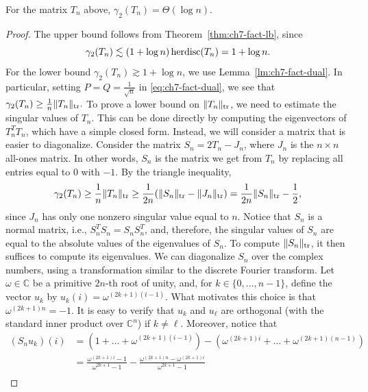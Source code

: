 \begin{lemma}\label{lm:ch7-gamma2-Tn}
  For the matrix $T_n$ above, $\gamma_2(T_n) = \Theta(\log n)$. 
\end{lemma}
\begin{proof}
  The upper bound follows from Theorem~\ref{thm:ch7-fact-lb}, since
  \[
    \gamma_2(T_n) \lesssim (1 + \log n) \operatorname{herdisc}(T_n) = 1 + \log n.
  \]
  For the lower bound $\gamma_2(T_n) \gtrsim 1+\log n$, we use
  Lemma~\ref{lm:ch7-fact-dual}. In particular, setting $P = Q =
  \frac{1}{\sqrt{n}}$ in \eqref{eq:ch7-fact-dual}, we see that
  \(
    \gamma_2(T_n) \ge \frac1n \|T_n\|_{\operatorname{tr}}.
  \)
  To prove a lower bound on $\|T_n\|_{\operatorname{tr}}$, we need to estimate the
  singular values of $T_n$. This can be done directly by computing the
  eigenvectors of $T_n^T T_n$, which have a simple closed
  form. Instead, we will consider a matrix that is easier to
  diagonalize. Consider the matrix $S_n = 2T_n - J_n$, where $J_n$ is
  the $n\times n$ all-ones matrix. In other words, $S_n$ is the matrix
  we get from $T_n$ by replacing all entries equal to $0$ with
  $-1$. By the triangle inequality,
  \begin{equation}\label{eq:ch7-Tn-lb}
    \gamma_2(T_n) \ge \frac1n \|T_n\|_{\operatorname{tr}}
    \ge \frac{1}{2n} (\|S_n\|_{\operatorname{tr}} - \|J_n\|_{\operatorname{tr}})
    = \frac{1}{2n} \|S_n\|_{\operatorname{tr}} - \frac12,
  \end{equation}
  since $J_n$ has only one nonzero singular value equal to $n$. Notice
  that $S_n$ is a normal matrix, i.e., $S_n^T S_n = S_nS_n^T$, and,
  therefore, the singular values of $S_n$ are equal to the absolute
  values of the eigenvalues of $S_n$. To compute $\|S_n\|_{\operatorname{tr}}$, it
  then suffices to compute its eigenvalues. We can diagonalize $S_n$
  over the complex numbers, using a transformation similar to the
  discrete Fourier transform. Let $\omega \in \mathbb{C}$ be a primitive $2n$-th
  root of unity, and, for $k \in \{0, \ldots, n-1\}$,  define the
  vector $u_k$ by $u_k(i) = \omega^{(2k + 1)(i-1)}$. What motivates
  this choice is that $\omega^{(2k + 1)n} = -1$. It is easy to
  verify that $u_k$ and $u_\ell$ are orthogonal (with the standard
  inner product over $\mathbb{C}^n$) if $k \neq \ell$. Moreover,
  notice that
  \begin{align*}
    (S_nu_k)(i)
    &=
      (1 + \ldots + \omega^{(2k + 1)(i-1)})
      - (\omega^{(2k + 1)i} +\ldots +  \omega^{(2k + 1)(n-1)})\\
    &= \frac{\omega^{(2k + 1)i} - 1}{\omega^{2k + 1} - 1}
      - \frac{\omega^{(2k + 1)n} - \omega^{(2k + 1)i}}{\omega^{2k + 1} - 1}\\

\end{align*}
\end{proof}
